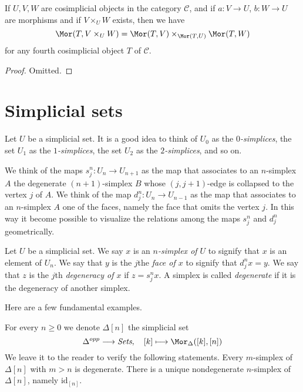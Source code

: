 \begin{lemma}
\label{lemma-fibre-product-cosimplicial-objects}
If $U, V, W$ are cosimplicial objects in the category $\mathcal{C}$,
and if $a : V \to U$, $b : W \to U$ are morphisms
and if $V \times_U W$ exists, then we have
$$
\Mor(T, V \times_U W) =
\Mor(T, V) \times_{\Mor(T, U)}
\Mor(T, W)
$$
for any fourth cosimplicial object $T$ of $\mathcal{C}$.
\end{lemma}

\begin{proof}
Omitted.
\end{proof}














\section{Simplicial sets}
\label{section-simplicial-set}

\noindent
Let $U$ be a simplicial set. It is a good idea to think of
$U_0$ as the {\it $0$-simplices}, the set $U_1$ as the
{\it $1$-simplices},
the set $U_2$ as the {\it $2$-simplices}, and so on.

\medskip\noindent
We think of the maps $s^n_j : U_n \to U_{n + 1}$ as
the map that associates to an $n$-simplex $A$ the degenerate
$(n + 1)$-simplex $B$ whose $(j, j + 1)$-edge is collapsed
to the vertex $j$ of $A$. We think of the map $d^n_j : U_n \to U_{n - 1}$
as the map that associates to an $n$-simplex $A$ one of the
faces, namely the face that omits the vertex $j$.
In this way it become possible to visualize the relations
among the maps $s^n_j$ and $d^n_j$ geometrically.

\begin{definition}
\label{definition-terminology-simplicial-sets}
Let $U$ be a simplicial set.
We say $x$ is an {\it $n$-simplex of $U$} to signify that
$x$ is an element of $U_n$. We say that $y$ is the $j$the
{\it face of $x$} to signify that $d^n_jx = y$. We say that
$z$ is the $j$th {\it degeneracy of $x$} if $z = s^n_jx$.
A simplex is called {\it degenerate} if it is the degeneracy
of another simplex.
\end{definition}

\noindent
Here are a few fundamental examples.

\begin{example}
\label{example-simplex-simplicial-set}
For every $n \geq 0$ we denote $\Delta[n]$ the simplicial set
$$
\Delta^{opp} \longrightarrow \textit{Sets},\quad
[k] \longmapsto \Mor_{\Delta}([k], [n])
$$
We leave it to the reader to verify the following statements.
Every $m$-simplex of $\Delta[n]$ with $m > n$ is degenerate.
There is a unique nondegenerate $n$-simplex of $\Delta[n]$,
namely $\text{id}_{[n]}$.
\end{example}

